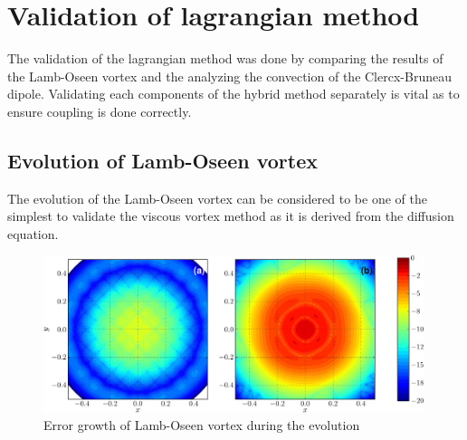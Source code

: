 %
\section{Validation of lagrangian method}
The validation of the lagrangian method was done by comparing the results of the Lamb-Oseen vortex and the analyzing the convection of the Clercx-Bruneau dipole. Validating each components of the hybrid method separately is vital as to ensure coupling is done correctly.

\subsection{Evolution of Lamb-Oseen vortex}
The evolution of the Lamb-Oseen vortex can be considered to be one of the simplest to validate the viscous vortex method as it is derived from the diffusion equation.

	\begin{figure}[!t]
	\centering
	\includegraphics[width=0.99\textwidth]{figures/lagrangian/lambOseen_convection_vorticityErrorContours_compressed-crop.pdf}
	\caption{Error growth of Lamb-Oseen vortex during the evolution}
	\label{fig:lambOseen_convection_vorticityErrorContours_compressed}
	\end{figure}

